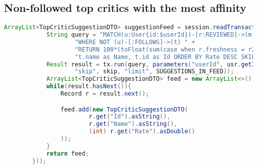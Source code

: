 \subsection{Non-followed top critics with the most affinity}
\begin{lstlisting}[language = Java, caption = suggestion feed]
ArrayList<TopCriticSuggestionDTO> suggestionFeed = session.readTransaction((TransactionWork<ArrayList<TopCriticSuggestionDTO>>)(tx -> {
            String query = "MATCH(u:User{id:$userId})-[r:REVIEWED]->(m:Movie)<-[r2:REVIEWED]-(t:TopCritic) "+
                    "WHERE NOT (u)-[:FOLLOWS]->(t) " +
                    "RETURN 100*(toFloat(sum(case when r.freshness = r2.freshness then 1 else 0 end)+1)/(count(m.title)+2)) as Rate, "+
                    "t.name as Name, t.id as Id ORDER BY Rate DESC SKIP $skip LIMIT $limit";
            Result result = tx.run(query, parameters("userId", usr.getId().toString(),
                    "skip", skip, "limit", SUGGESTIONS_IN_FEED));
            ArrayList<TopCriticSuggestionDTO> feed = new ArrayList<>();
            while(result.hasNext()){
                Record r = result.next();

                feed.add(new TopCriticSuggestionDTO(
                        r.get("Id").asString(),
                        r.get("Name").asString(),
                        (int) r.get("Rate").asDouble()
                ));
            }
            return feed;
        }));
\end{lstlisting}


